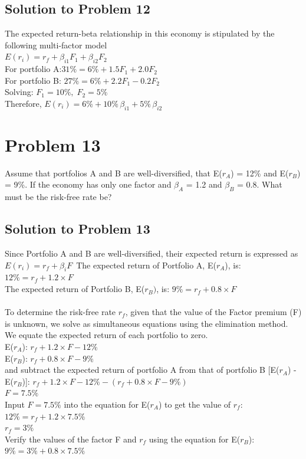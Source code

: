 \documentclass[12]{article}
\begin{document}
\color{blue}
\subsection*{Solution to Problem 12}
The expected return-beta relationship in this economy is stipulated by the following multi-factor model\\
$E(r_i) = r_f+ \beta_{i1}F_1 + \beta_{i2}F_2$\\
For portfolio A:$31\% = 6\% + 1.5F_1 + 2.0F_2$\\
For portfolio B: $27\% = 6\% + 2.2F_1 - 0.2F_2$\\
Solving: $F_1 = 10\%,\; F_2 = 5\%$\\
Therefore, $E(r_i) = 6\% + 10\%\,\beta_{i1} + 5\%\,\beta_{i2}$




\color{black}
\section*{Problem 13}
Assume that portfolios A and B are well-diversified, that E($r_A$) = 12\% and E($r_B$) = 9\%. If the economy has only one factor and $\beta_A$ = 1.2 and $\beta_B$ = 0.8. What must be the risk-free rate be?

\color{blue}
\subsection*{Solution to Problem 13}
Since Portfolio A and B are well-diversified, their expected return is expressed as 
$E(r_i) = r_f + \beta_{i}F$\
The expected return of Portfolio A, E($r_A$), is: $12\% = r_f + 1.2 \times F$\\
The expected return of Portfolio B, E($r_B)$, is: $9\% = r_f + 0.8 \times F$\\
\\
To determine the risk-free rate $r_f$, given that the value of the Factor premium (F) is unknown, we solve as simultaneous equations using the elimination method.\\
We equate the expected return of each portfolio to zero.\\
E($r_A$): $r_f + 1.2 \times F - 12\%$\\
E($r_B$): $r_f + 0.8 \times F - 9\%$\\
and subtract the expected return of portfolio A from that of portfolio B [E($r_A$) - E($r_B$)]: 
$r_f + 1.2 \times F - 12\% - (r_f + 0.8 \times F - 9\%)$\\
$F = 7.5\%$\\
Input $F = 7.5\%$ into the equation for E($r_A$) to get the value of $r_f$:\\
$12\% = r_f + 1.2 \times 7.5\%$\\
$r_f = 3\%$\\
Verify the values of the factor F and $r_f$ using the equation for E($r_B$):\\
$9\% = 3\% + 0.8 \times 7.5\%$
\end{document}

